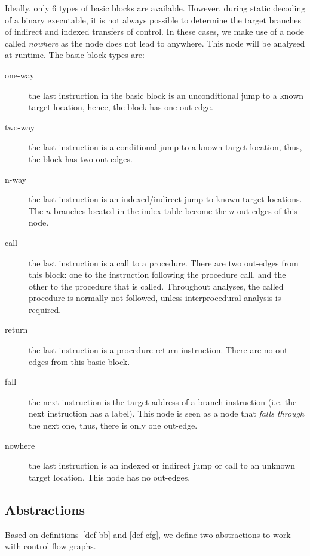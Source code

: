 Ideally, only 6 types of basic blocks are available.  However, 
during static decoding of a binary executable, it is not always
possible to determine the target branches of indirect and indexed
transfers of control.  In these cases, we make use of a node called
{\em nowhere} as the node does not lead to anywhere.  This node
will be analysed at runtime.  
The basic block types are: 

\begin{description}
\item [one-way] the last instruction in the basic block is an
unconditional jump to a known target location, hence, the block has one 
out-edge.

\item [two-way] the last instruction is a conditional jump to a 
known target location, thus, the block has two out-edges.

\item [n-way] the last instruction is an indexed/indirect jump to
known target locations.  The $n$ branches located in the index table become 
the $n$ out-edges of this node.

\item [call] the last instruction is a call to a procedure.
There are two out-edges from this block: one to the instruction following
the procedure call, and the other to the procedure that is called.
Throughout analyses, the called procedure is normally not followed,
unless interprocedural analysis is required.

\item [return] the last instruction is a procedure return instruction.
There are no out-edges from this basic block.

\item [fall] the next instruction is the target address of a
branch instruction (i.e. the next instruction has a label).  This node
is seen as a node that {\it falls through} the next one, thus, there is
only one out-edge.

\item [nowhere] the last instruction is an indexed or indirect jump
or call to an unknown target location.  This node has no out-edges. 
\end{description}


\subsection{Abstractions}
Based on definitions~\ref{def-bb} and \ref{def-cfg}, we define two 
abstractions to work with control flow graphs.

